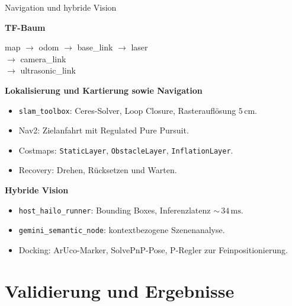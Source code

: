 \documentclass[aspectratio=169]{beamer}
\begin{document}
\begin{frame}{Navigation und hybride Vision}

  \textbf{TF-Baum}

  {\ttfamily\small
    map $\rightarrow$ odom $\rightarrow$ base\_link $\rightarrow$ laser\\
    \hspace*{12.5em}$\rightarrow$ camera\_link\\
    \hspace*{12.5em}$\rightarrow$ ultrasonic\_link
  }

  \vspace{0.5em}
  \textbf{Lokalisierung und Kartierung sowie Navigation}
  \begin{itemize}
    \item \texttt{slam\_toolbox}: Ceres-Solver, Loop Closure,
          Rasterauflösung $5\,\mathrm{cm}$.
    \item Nav2: Zielanfahrt mit Regulated Pure Pursuit.
    \item Costmaps: \texttt{StaticLayer}, \texttt{ObstacleLayer},
          \texttt{InflationLayer}.
    \item Recovery: Drehen, Rücksetzen und Warten.
  \end{itemize}

  \vspace{0.5em}
  \textbf{Hybride Vision}
  \begin{itemize}
    \item \texttt{host\_hailo\_runner}: Bounding Boxes, Inferenzlatenz
          ${\sim}\,34\,\mathrm{ms}$.
    \item \texttt{gemini\_semantic\_node}: kontextbezogene Szenenanalyse.
    \item Docking: ArUco-Marker, SolvePnP-Pose, P-Regler zur
          Feinpositionierung.
  \end{itemize}

\end{frame}

\section{Validierung und Ergebnisse}
\end{document}
